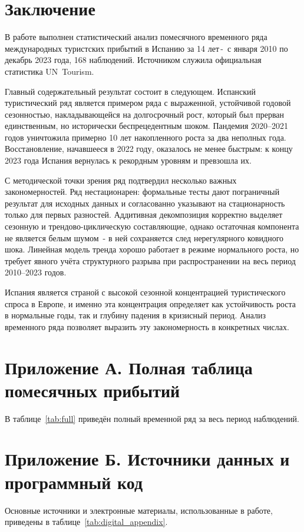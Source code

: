 \documentclass[a4paper,14pt]{extarticle}
\newcommand{\dash}{\,-~}
\begin{document}
\section*{Заключение}
В работе выполнен статистический анализ помесячного
временного ряда международных туристских прибытий в Испанию
за 14 лет\dash с января 2010 по декабрь 2023 года, 168 наблюдений.
Источником служила официальная статистика UN~Tourism.

Главный содержательный результат состоит в следующем.
Испанский туристический ряд является примером ряда с выраженной,
устойчивой годовой сезонностью, накладывающейся на долгосрочный
рост, который был прерван единственным, но исторически
беспрецедентным шоком. Пандемия 2020–2021 годов уничтожила
примерно 10 лет накопленного роста за два неполных года.
Восстановление, начавшееся в 2022 году, оказалось не менее
быстрым: к концу 2023 года Испания вернулась к рекордным
уровням и превзошла их.

С методической точки зрения ряд подтвердил несколько
важных закономерностей. Ряд нестационарен: формальные тесты
дают пограничный результат для исходных данных и согласованно
указывают на стационарность только для первых разностей.
Аддитивная декомпозиция корректно выделяет сезонную
и трендово-циклическую составляющие, однако остаточная
компонента не является белым шумом~- в ней сохраняется
след нерегулярного ковидного шока. Линейная модель тренда
хорошо работает в режиме нормального роста, но требует
явного учёта структурного разрыва при распространении
на весь период 2010–2023 годов.

Испания является страной с высокой сезонной концентрацией
туристического спроса в Европе, и именно эта концентрация
определяет как устойчивость роста в нормальные годы, так
и глубину падения в кризисный период. Анализ временного ряда
позволяет выразить эту закономерность в конкретных числах.

\section*{Приложение А. Полная таблица помесячных прибытий}
В таблице~\ref{tab:full} приведён полный временной ряд
за весь период наблюдений.



\section*{Приложение Б. Источники данных и программный код}
Основные источники и электронные материалы, использованные в работе,
приведены в таблице~\ref{tab:digital_appendix}.
\end{document}
